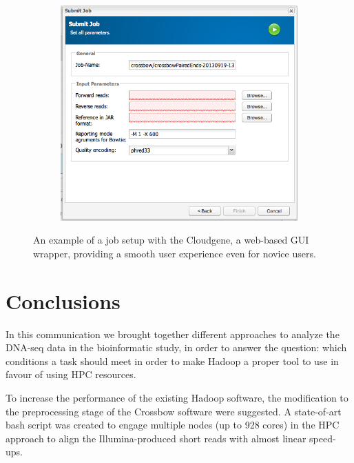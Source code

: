 \documentclass[11pt, oneside]{article}   	%
\begin{document}
\begin{figure}
\begin{subfigure}[b]{0.4\textwidth}
	\end{subfigure}
	\begin{subfigure}[b]{0.6\textwidth}
		\includegraphics[width=\textwidth]{b.png}
	\end{subfigure}
	\caption{An example of a job setup with the Cloudgene, a web-based GUI wrapper, providing a smooth user experience even for novice users.}
	\label{fig:fig4}
\end{figure}


\section{Conclusions}
\label{sectionV}

In this communication we brought together different approaches to analyze  the DNA-seq data in the bioinformatic study, in order to answer the question: which conditions a task should meet in order to make Hadoop a proper tool to use in favour of using HPC resources. 

To increase the performance of the existing Hadoop software, the modification to the preprocessing stage of the Crossbow software were suggested.  A state-of-art bash script was created to engage multiple nodes (up to 928 cores) in the HPC approach to align the Illumina-produced short reads with almost linear speed-ups.
\end{document}
